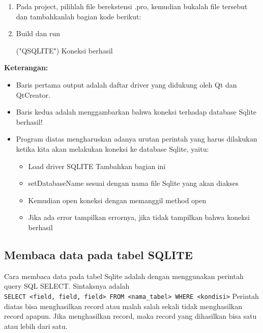 \begin{enumerate}
\item
Pada project, pilihlah file berekstensi .pro, kemudian bukalah file
tersebut dan tambahkanlah bagian kode berikut:



\item
Build dan run

\begin{lcverbatim}
("QSQLITE")
Koneksi berhasil
\end{lcverbatim}
\end{enumerate}

\textbf{Keterangan:}

\begin{itemize}

\item
Baris pertama output adalah daftar driver yang didukung oleh Qt dan
QtCreator.
\item
Baris kedua adalah menggambarkan bahwa koneksi terhadap database
Sqlite berhasil!
\item
Program diatas mengharuskan adanya urutan perintah yang harus
dilakukan ketika kita akan melakukan koneksi ke database Sqlite,
yaitu: 

\begin{itemize}
\item Load driver SQLITE Tambahkan bagian ini
\item setDatabaseName sesuai dengan nama file Sqlite yang akan diakses 
\item Kemudian open koneksi dengan memanggil method open 
\item Jika ada error tampilkan errornya, jika tidak tampilkan bahwa koneksi berhasil
\end{itemize}

\end{itemize}

\subsection{Membaca data pada tabel SQLITE}

Cara membaca data pada tabel Sqlite adalah dengan menggunakan perintah
query SQL SELECT. Sintaksnya adalah
\texttt{SELECT\ \textless{}field,\ field,\ field\textgreater{}\ FROM\ \textless{}nama\_tabel\textgreater{}\ WHERE\ \textless{}kondisi\textgreater{}}
Perintah diatas bisa menghasilkan record atau malah salah sekali tidak
menghasilkan record apapun. Jika menghasilkan record, maka record yang
dihasilkan bisa satu atau lebih dari satu.

